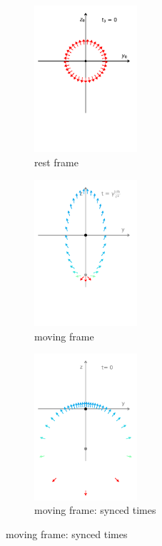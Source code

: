\begin{figure}[H]
	\begin{subfigure}{.32\textwidth}
		\centering
		\includegraphics[width = 3.8cm]{images/pdf/Rest_Pulse.pdf}
		\caption{rest frame \newline}
		\label{fig: Relativistic beaming 1}
	\end{subfigure}
	\begin{subfigure}{.32\textwidth}
		\centering
		\includegraphics[width = 3.8cm]{images/pdf/Prime_Pulse.pdf}
		\caption{moving frame \newline}
		\label{fig: Relativistic beaming 2}
	\end{subfigure}
	\begin{subfigure}{.32\textwidth}
		\centering
		\includegraphics[width = 3.8cm]{images/pdf/Prime_Pulse_Simultaneous.pdf}
		\caption{moving frame: synced times}
		\label{fig: Relativistic beaming 3}
	\end{subfigure}

\end{figure}
